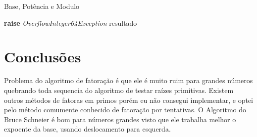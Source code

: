 \documentclass[conference]{IEEEtran}
\begin{document}
\begin{algorithm}
  \caption{Base, Potência e Modulo}\label{powmod}
  \begin{algorithmic}
        \State \textbf{raise} \textit{OverflowInteger64Exception}
      \EndIf
        \EndIf
      \EndWhile
      \Return resultado
    \EndFunction
  \end{algorithmic}
\end{algorithm}

\section{Conclusões}

Problema do algoritmo de fatoração é que ele é muito ruim para grandes números
quebrando toda sequencia do algoritmo de testar raízes primitivas. Existem 
outros métodos de fatoras em primos porém eu não consegui implementar, e optei
pelo método comumente conhecido de fatoração por tentativas. O Algoritmo do 
Bruce Schneier \cite{schneier} é bom para números grandes visto que ele trabalha
melhor o expoente da base, usando deslocamento para esquerda.
\end{document}
